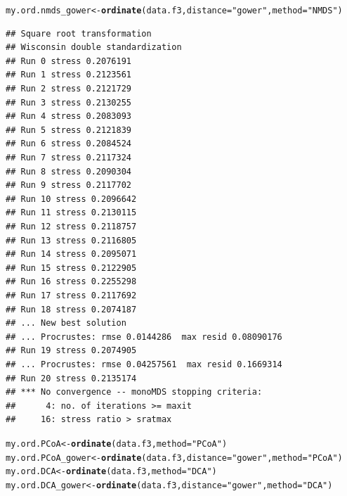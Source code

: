 \documentclass[12pt]{article}\usepackage[]{graphicx}\usepackage[]{color}
\makeatletter
\newcommand{\hlstr}[1]{\textcolor[rgb]{0.192,0.494,0.8}{#1}}%
\newcommand{\hlstd}[1]{\textcolor[rgb]{0.345,0.345,0.345}{#1}}%
\newcommand{\hlkwb}[1]{\textcolor[rgb]{0.69,0.353,0.396}{#1}}%
\newcommand{\hlkwc}[1]{\textcolor[rgb]{0.333,0.667,0.333}{#1}}%
\newcommand{\hlkwd}[1]{\textcolor[rgb]{0.737,0.353,0.396}{\textbf{#1}}}%
\newenvironment{kframe}{%
 \def\at@end@of@kframe{}%
 \ifinner\ifhmode%
  \def\at@end@of@kframe{\end{minipage}}%
  \begin{minipage}{\columnwidth}%
 \fi\fi%
 \def\FrameCommand##1{\hskip\@totalleftmargin \hskip-\fboxsep
 \colorbox{shadecolor}{##1}\hskip-\fboxsep
     \hskip-\linewidth \hskip-\@totalleftmargin \hskip\columnwidth}%
 \MakeFramed {\advance\hsize-\width
   \@totalleftmargin\z@ \linewidth\hsize
   \@setminipage}}%
 {\par\unskip\endMakeFramed%
 \at@end@of@kframe}
\newenvironment{knitrout}{}{} %
\numberwithin{figure}{section}
\makeatother
\begin{document}
\begin{knitrout}\small
{}\color{fgcolor}\begin{kframe}
\begin{alltt}
\hlstd{my.ord.nmds_gower} \hlkwb{<-} \hlkwd{ordinate}\hlstd{(data.f3,} \hlkwc{distance} \hlstd{=} \hlstr{"gower"}\hlstd{,}  \hlkwc{method} \hlstd{=} \hlstr{"NMDS"}\hlstd{)}
\end{alltt}
\begin{verbatim}
## Square root transformation
## Wisconsin double standardization
## Run 0 stress 0.2076191 
## Run 1 stress 0.2123561 
## Run 2 stress 0.2121729 
## Run 3 stress 0.2130255 
## Run 4 stress 0.2083093 
## Run 5 stress 0.2121839 
## Run 6 stress 0.2084524 
## Run 7 stress 0.2117324 
## Run 8 stress 0.2090304 
## Run 9 stress 0.2117702 
## Run 10 stress 0.2096642 
## Run 11 stress 0.2130115 
## Run 12 stress 0.2118757 
## Run 13 stress 0.2116805 
## Run 14 stress 0.2095071 
## Run 15 stress 0.2122905 
## Run 16 stress 0.2255298 
## Run 17 stress 0.2117692 
## Run 18 stress 0.2074187 
## ... New best solution
## ... Procrustes: rmse 0.0144286  max resid 0.08090176 
## Run 19 stress 0.2074905 
## ... Procrustes: rmse 0.04257561  max resid 0.1669314 
## Run 20 stress 0.2135174 
## *** No convergence -- monoMDS stopping criteria:
##      4: no. of iterations >= maxit
##     16: stress ratio > sratmax
\end{verbatim}
\begin{alltt}
\hlstd{my.ord.PCoA} \hlkwb{<-} \hlkwd{ordinate}\hlstd{(data.f3,} \hlkwc{method} \hlstd{=} \hlstr{"PCoA"}\hlstd{)}
\hlstd{my.ord.PCoA_gower} \hlkwb{<-} \hlkwd{ordinate}\hlstd{(data.f3,} \hlkwc{distance} \hlstd{=} \hlstr{"gower"}\hlstd{,} \hlkwc{method} \hlstd{=} \hlstr{"PCoA"}\hlstd{)}
\hlstd{my.ord.DCA} \hlkwb{<-} \hlkwd{ordinate}\hlstd{(data.f3,} \hlkwc{method} \hlstd{=} \hlstr{"DCA"}\hlstd{)}
\hlstd{my.ord.DCA_gower} \hlkwb{<-} \hlkwd{ordinate}\hlstd{(data.f3,} \hlkwc{distance} \hlstd{=} \hlstr{"gower"}\hlstd{,} \hlkwc{method} \hlstd{=} \hlstr{"DCA"}\hlstd{)}


\end{alltt}
\end{kframe}
\end{knitrout}
\end{document}
